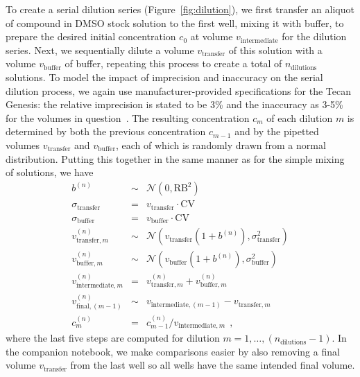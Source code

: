 \documentclass[aps,pre,twocolumn,nofootinbib,superscriptaddress,linenumbers]{revtex4-1}
\begin{document}
To create a serial dilution series (Figure~\ref{fig:dilution}), we first transfer an aliquot of compound in DMSO stock solution to the first well, mixing it with buffer, to prepare the desired initial concentration $c_0$ at volume $v_\mathrm{intermediate}$ for the dilution series.
Next, we sequentially dilute a volume $v_\mathrm{transfer}$ of this solution with a volume $v_\mathrm{buffer}$ of buffer, repeating this process to create a total of $n_\mathrm{dilutions}$ solutions. 
To model the impact of imprecision and inaccuracy on the serial dilution process, we again use manufacturer-provided specifications for the Tecan Genesis: the relative imprecision is stated to be 3\% and the inaccuracy as 3-5\% for the volumes in question~\cite{_tecan_2001}. 
The resulting concentration $c_m$ of each dilution $m$ is determined by both the previous concentration $c_{m-1}$  and by the pipetted volumes $v_\mathrm{transfer}$ and $v_\mathrm{buffer}$, each of which is randomly drawn from a normal distribution.
Putting this together in the same manner as for the simple mixing of solutions, we have
\begin{eqnarray}
b^{(n)} &\sim& \mathcal{N}(0, \mathrm{RB}^2) \nonumber \\
\sigma_\mathrm{transfer} &=& v_\mathrm{transfer} \cdot \mathrm{CV} \nonumber \\
\sigma_\mathrm{buffer} &=& v_\mathrm{buffer} \cdot \mathrm{CV} \nonumber \\
v_{\mathrm{transfer},m}^{(n)} &\sim& \mathcal{N}(v_\mathrm{transfer} (1 + b^{(n)}) , \sigma_\mathrm{transfer}^2) \nonumber \\
v_{\mathrm{buffer},m}^{(n)} &\sim& \mathcal{N}(v_\mathrm{buffer} (1 + b^{(n)}), \sigma_\mathrm{buffer}^2) \nonumber \\
v_{\mathrm{intermediate}, m}^{(n)} &=& v_{\mathrm{transfer}, m}^{(n)} + v_{\mathrm{buffer}, m}^{(n)}  \nonumber \\
v_{\mathrm{final}, (m-1)}^{(n)} &\sim& v_{\mathrm{intermediate}, (m-1)} - v_{\mathrm{transfer}, m} \nonumber \\
c_m^{(n)} &=& c_{m-1}^{(n)} / v_{\mathrm{intermediate}, m} \:\: , \label{equation:stock-concentration-uncertainty-simple}
\end{eqnarray}
where the last five steps are computed for dilution $m = 1, \ldots, (n_\mathrm{dilutions}-1)$.
In the companion notebook, we make comparisons easier by also removing a final volume $v_\mathrm{transfer}$ from the last well so all wells have the same intended final volume.
\end{document}
